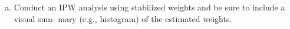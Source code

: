 \begin{enumerate}[(a)]
\item
  \begin{quoting}
    Conduct an IPW analysis using stabilized weights and be sure to
    include a visual sum- mary (e.g., histogram) of the estimated
    weights.
  \end{quoting}
  
\end{enumerate}

